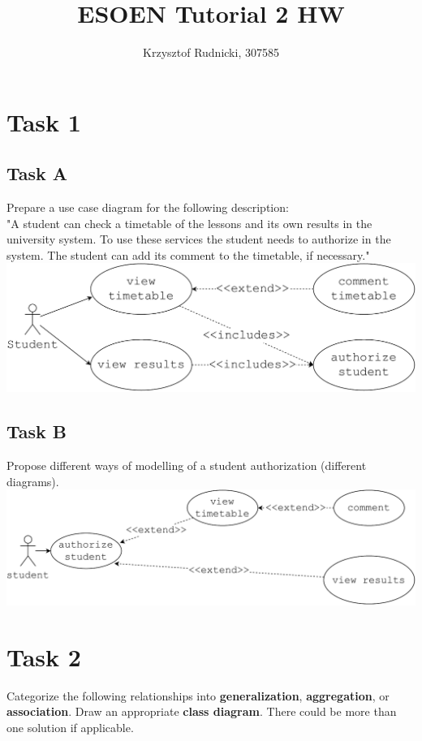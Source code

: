 \documentclass[12pt]{article}
\title{ESOEN Tutorial 2 HW}
\author{Krzysztof Rudnicki, 307585}
\begin{document}
\maketitle
\section{Task 1}

\subsection{Task A}
Prepare a use case diagram for the following description:  \\

"A student can check a timetable of the lessons and its own results in the university system.  To use these services the student needs to authorize in the system. The student can add its comment to the timetable, if necessary." 
\\
\includegraphics[width=\textwidth]{1A.pdf}

\subsection{Task B}
Propose different ways of modelling of a student authorization (different diagrams).  \\ 
\includegraphics[width=\textwidth]{1B.pdf}


\newpage
\section{Task 2}
Categorize the following relationships into \textbf{generalization},  \textbf{aggregation}, or  \textbf{association}. Draw an appropriate  \textbf{class diagram}. There could be more than one solution if applicable. 
\end{document}
